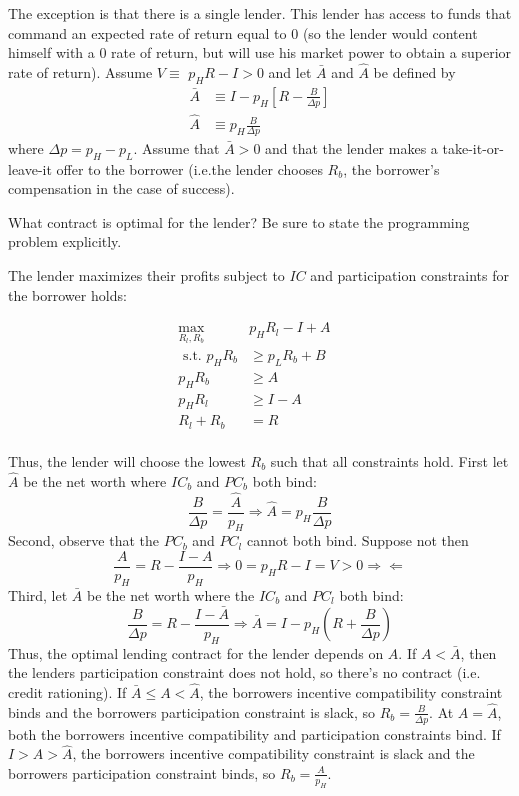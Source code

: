 \documentclass[12pt]{amsart}
\begin{document}
{{\begin{exercise}
The exception is that there is a single lender. This lender has access to funds that command an expected rate of return equal to 0
(so the lender would content himself with a 0 rate of return, but will use his market power to obtain a superior rate of return).
Assume $V \equiv$ $p_{H} R-I>0$ and let $\bar{A}$ and $\widehat{A}$ be defined by
$$
\begin{aligned}
\bar{A} & \equiv I-p_{H}\left[R-\frac{B}{\Delta p}\right] \\
\widehat{A} & \equiv p_{H} \frac{B}{\Delta p}
\end{aligned}
$$
where $\Delta p=p_{H}-p_{L}$. Assume that $\bar{A}>0$ and that the lender makes a take-it-or-leave-it offer to the borrower (i.e.the lender chooses $R_{b}$, the borrower's compensation in the case of success).

\end{exercise}
\begin{subexercise}
    What contract is optimal for the lender? Be sure to state the programming problem explicitly.
\end{subexercise}
\begin{answer}
    The lender maximizes their profits subject to $IC$ and participation constraints for the borrower holds:
    
    \begin{align*}
        \max _{R_{l}, R_{b}} &p_{H} R_{l}-I+A & \\
        \text { s.t. } p_{H} R_{b} & \geq p_{L} R_{b}+B \\
        p_{H} R_{b} & \geq A \\
        p_{H} R_{l} & \geq I-A \\
        R_{l}+R_{b} & =R \\
    \end{align*}
    

    Thus, the lender will choose the lowest $R_{b}$ such that all constraints hold. First let $\hat{A}$ be the net worth where $I C_{b}$ and $P C_{b}$ both bind:
    $$
    \frac{B}{\Delta p}=\frac{\hat{A}}{p_{H}} \Longrightarrow \hat{A}=p_{H} \frac{B}{\Delta p}
    $$
    Second, observe that the $P C_{b}$ and $P C_{l}$ cannot both bind. Suppose not then
    $$
    \frac{A}{p_{H}}=R-\frac{I-A}{p_{H}} \Longrightarrow 0=p_{H} R-I=V>0 \Rightarrow \Leftarrow
    $$
    Third, let $\bar{A}$ be the net worth where the $I C_{b}$ and $P C_{l}$ both bind:
    $$
    \frac{B}{\Delta p}=R-\frac{I-\bar{A}}{p_{H}} \Longrightarrow \bar{A}=I-p_{H}\left(R+\frac{B}{\Delta p}\right)
    $$
    Thus, the optimal lending contract for the lender depends on $A .$ If $A<\bar{A}$, then the lenders participation constraint does not hold, so there's no contract (i.e. credit rationing). If $\bar{A} \leq A<\hat{A}$, the borrowers incentive compatibility constraint binds and the borrowers participation constraint is slack, so $R_{b}=\frac{B}{\Delta p} .$ At $A=\hat{A}$, both the borrowers incentive compatibility and participation constraints bind. If $I>A>\hat{A}$, the borrowers incentive compatibility constraint is slack and the borrowers participation constraint binds, so $R_{b}=\frac{A}{p_{H}}$.
\end{answer}

}}
\end{document}
